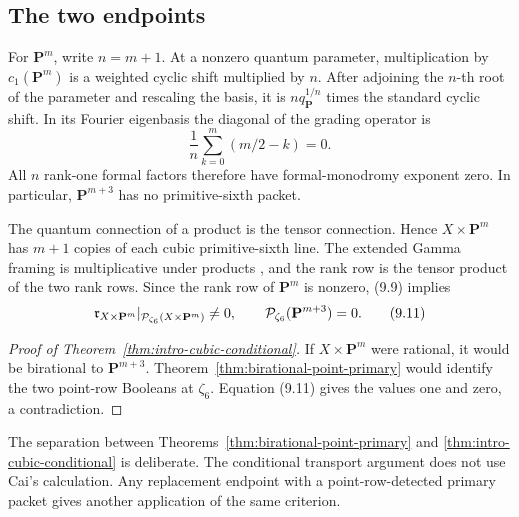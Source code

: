 \subsection{The two endpoints}

For \(\mathbf P^m\), write \(n=m+1\).  At a nonzero quantum parameter,
multiplication by \(c_1(\mathbf P^m)\) is a weighted cyclic shift multiplied
by \(n\).  After adjoining the \(n\)-th root of the parameter and rescaling
the basis, it is \(nq_{\mathbf P}^{1/n}\) times the standard cyclic shift.  In its
Fourier eigenbasis the diagonal of the grading operator is
\[
 \frac1n\sum_{k=0}^{m}(m/2-k)=0.                             \tag{9.10}
\]
All \(n\) rank-one formal factors therefore have formal-monodromy exponent
zero.  In particular, \(\mathbf P^{m+3}\) has no primitive-sixth packet.

The quantum connection of a product is the tensor connection.  Hence
\(X\times\mathbf P^m\) has \(m+1\) copies of each cubic primitive-sixth line.
The extended Gamma framing is multiplicative under products
\cite[Remark~1.2]{IritaniGamma}, and the rank row is the tensor product of
the two rank rows.  Since the rank row of \(\mathbf P^m\) is nonzero, (9.9)
implies
\[
 \mathfrak r_{X\times\mathbf P^m}
   |_{\mathcal P_{\zeta_6}(X\times\mathbf P^m)}\ne0,
 \qquad
 \mathcal P_{\zeta_6}(\mathbf P^{m+3})=0.                          \tag{9.11}
\]

\begin{proof}[Proof of Theorem~\ref{thm:intro-cubic-conditional}]
If \(X\times\mathbf P^m\) were rational, it would be birational to
\(\mathbf P^{m+3}\).  Theorem~\ref{thm:birational-point-primary} would identify
the two point-row Booleans at \(\zeta_6\).  Equation (9.11) gives the values
one and zero, a contradiction.
\end{proof}

The separation between Theorems~\ref{thm:birational-point-primary} and
\ref{thm:intro-cubic-conditional} is deliberate.  The conditional transport
argument does not use Cai's calculation.  Any replacement endpoint with a
point-row-detected primary packet gives another application of the same
criterion.
